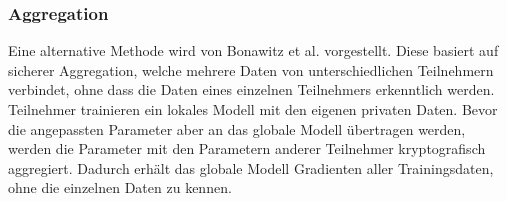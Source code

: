 \subsubsection*{Aggregation}
Eine alternative Methode wird von Bonawitz et al. \cite{P-36} vorgestellt.
Diese basiert auf sicherer Aggregation, welche mehrere Daten von unterschiedlichen Teilnehmern verbindet, ohne dass die Daten eines einzelnen Teilnehmers erkenntlich werden.
Teilnehmer trainieren ein lokales Modell mit den eigenen privaten Daten. 
Bevor die angepassten Parameter aber an das globale Modell übertragen werden, werden die Parameter mit den Parametern anderer Teilnehmer kryptografisch aggregiert.
Dadurch erhält das globale Modell Gradienten aller Trainingsdaten, ohne die einzelnen Daten zu kennen.


